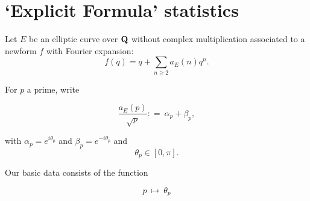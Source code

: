 \documentclass[11pt]{article}
\theoremstyle{plain}
\theoremstyle{definition}
\numberwithin{equation}{section}
\numberwithin{figure}{section}
\numberwithin{table}{section}
\def\Q{\bf{Q}}
\begin{document}

 \section{`Explicit Formula' statistics}

Let $E$ be an elliptic curve over ${\Q}$ without complex multiplication associated to a newform $f$ with Fourier expansion:
$$f(q) = q+\sum_{n\ge 2}a_E(n)q^n.$$

For $p$ a prime, write

\begin{equation}
{\frac{a_E(p)}{\sqrt p}}: = \   \alpha_p+\beta_p,
\end{equation}

with $\alpha_p= e^{i\theta_p}$ and  $\beta_p= e^{-i\theta_p}$
and
\begin{equation}
  \theta_p \in [0, \pi].
\end{equation}


Our basic data consists of the function

\begin{equation}\label{data}
p \ \mapsto\ \theta_p
\end{equation}
\end{document}
